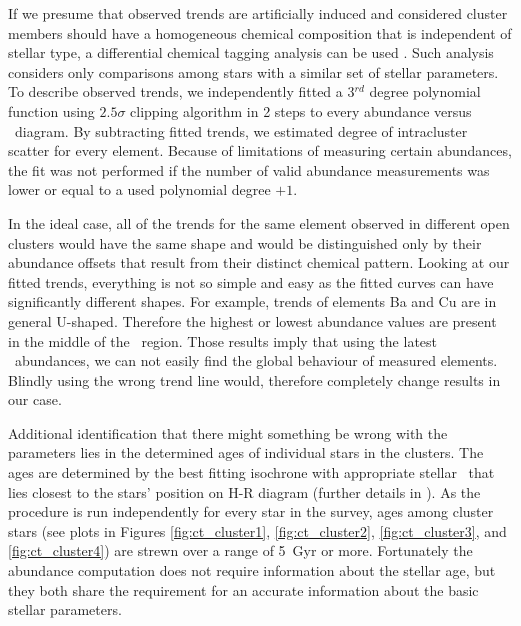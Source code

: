 If we presume that observed trends are artificially induced and considered cluster members should have a homogeneous chemical composition that is independent of stellar type, a differential chemical tagging analysis can be used \cite{2019arXiv191208539C}. Such analysis considers only comparisons among stars with a similar set of stellar parameters. To describe observed trends, we independently fitted a 3$^{rd}$ degree polynomial function using $2.5\sigma$ clipping algorithm in 2 steps to every abundance versus \Teff\ diagram. By subtracting fitted trends, we estimated degree of intracluster scatter for every element. Because of limitations of measuring certain abundances, the fit was not performed if the number of valid abundance measurements was lower or equal to a used polynomial degree $+1$.

In the ideal case, all of the trends for the same element observed in different open clusters would have the same shape and would be distinguished only by their abundance offsets that result from their distinct chemical pattern. Looking at our fitted trends, everything is not so simple and easy as the fitted curves can have significantly different shapes. For example, trends of elements Ba and Cu are in general U-shaped. Therefore the highest or lowest abundance values are present in the middle of the \Teff\ region. Those results imply that using the latest \Gh\ abundances, we can not easily find the global behaviour of measured elements. Blindly using the wrong trend line would, therefore completely change results in our case.

Additional identification that there might something be wrong with the parameters lies in the determined ages of individual stars in the clusters. The ages are determined by the best fitting isochrone with appropriate stellar \Feh\ that lies closest to the stars' position on H-R diagram (further details in \citet{buder2020}). As the procedure is run independently for every star in the survey, ages among cluster stars (see plots in Figures \ref{fig:ct_cluster1}, \ref{fig:ct_cluster2}, \ref{fig:ct_cluster3}, and \ref{fig:ct_cluster4}) are strewn over a range of 5~Gyr or more. Fortunately the abundance computation does not require information about the stellar age, but they both share the requirement for an accurate information about the basic stellar parameters.


